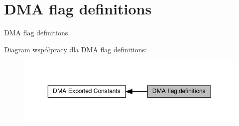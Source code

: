 \hypertarget{group___d_m_a__flag__definitions}{}\section{D\+MA flag definitions}
\label{group___d_m_a__flag__definitions}


D\+MA flag definitions.  


Diagram współpracy dla D\+MA flag definitions\+:\nopagebreak
\begin{figure}[H]
\begin{center}
\leavevmode
\includegraphics[width=350pt]{group___d_m_a__flag__definitions}
\end{center}
\end{figure}
